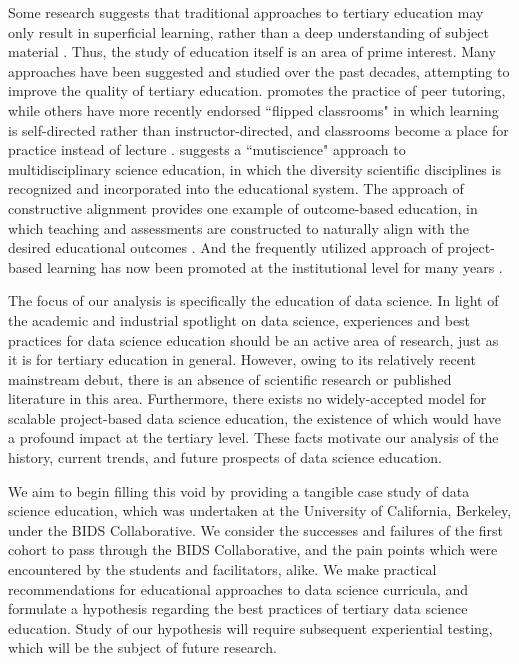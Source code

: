\documentclass[12pt]{article}
\begin{document}
Some research suggests that traditional approaches to tertiary education may only result in superficial learning, rather than a deep understanding of subject material \citep{Entwistle1992}.  Thus, the study of education itself is an area of prime interest.  Many approaches have been suggested and studied over the past decades, attempting to improve the quality of tertiary education.  \citet{Topping1996} promotes the practice of peer tutoring, while others have more recently endorsed ``flipped classrooms" in which learning is self-directed rather than instructor-directed, and classrooms become a place for practice instead of lecture \citep{Horn2013, Herreid2013}.  \citet{Ogawa1995} suggests a ``mutiscience" approach to multidisciplinary science education, in which the diversity scientific disciplines is recognized and incorporated into the educational system.  The approach of constructive alignment provides one example of outcome-based education, in which teaching and assessments are constructed to naturally align with the desired educational outcomes \citep{biggs2003aligning, biggs2011teaching}.  And the frequently utilized approach of project-based learning has now been promoted at the institutional level for many years \citep{Thomas2000, Krajcik2006}.

The focus of our analysis is specifically the education of data science. In light of the academic and industrial spotlight on data science, experiences and best practices for data science education should be an active area of research, just as it is for tertiary education in general.  However, owing to its relatively recent mainstream debut, there is an absence of scientific research or published literature in this area.  Furthermore, there exists no widely-accepted model for scalable project-based data science education, the existence of which would have a profound impact at the tertiary level.  These facts motivate our analysis of the history, current trends, and future prospects of data science education.

We aim to begin filling this void by providing a tangible case study of data science education, which was undertaken at the University of California, Berkeley, under the BIDS Collaborative. We consider the successes and failures of the first cohort to pass through the BIDS Collaborative, and the pain points which were encountered by the students and facilitators, alike.  We make practical recommendations for educational approaches to data science curricula, and formulate a hypothesis regarding the best practices of tertiary data science education.  Study of our hypothesis will require subsequent experiential testing, which will be the subject of future research.
\end{document}
